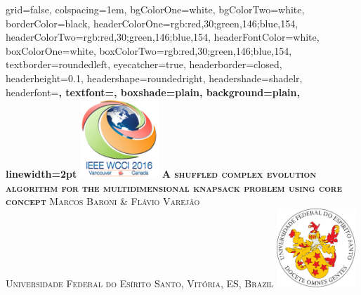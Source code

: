 \documentclass[landscape,final,a0paper,fontscale=0.38]{baposter}
\begin{document}
\begin{poster}%
  {
  grid=false,
  colspacing=1em,
  bgColorOne=white,
  bgColorTwo=white,
  borderColor=black,
  headerColorOne={rgb:red,30;green,146;blue,154},
  headerColorTwo={rgb:red,30;green,146;blue,154},
  headerFontColor=white,
  boxColorOne=white,
  boxColorTwo={rgb:red,30;green,146;blue,154},
  textborder=roundedleft,
  eyecatcher=true,
  headerborder=closed,
  headerheight=0.1\textheight,
  headershape=roundedright,
  headershade=shadelr,
  headerfont=\Large\bf\textsc, %
  textfont={\setlength{\parindent}{1.5em}},
  boxshade=plain,
  background=plain,
  linewidth=2pt
  }
  {\includegraphics[height=8em]{imgs/wcci-logo}} 
  {
 \bf\textsc{ \LARGE \fontsize{20pt}{0.5cm}\selectfont A shuffled complex evolution algorithm for
the multidimensional knapsack problem using core concept}\vspace{0.3em}}
{\textsc{Marcos Baroni \& Flávio Varejão \\ \vspace{0.1em} {\large Universidade Federal do Es\'irito Santo, Vit\'oria, ES, Brazil} }}
  {%
    \includegraphics[height=8.0em]{../../brasao-ufes}
  }

    \newcommand{\colouredcircle}{%
      \tikz{\useasboundingbox (-0.2em,-0.32em) rectangle(0.2em,0.32em); \draw[draw=black,fill=lightblue,line width=0.03em] (0,0) circle(0.18em);}}


\end{poster}
\end{document}
